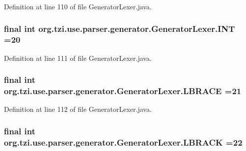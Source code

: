 Definition at line 110 of file Generator\-Lexer.\-java.

\hypertarget{classorg_1_1tzi_1_1use_1_1parser_1_1generator_1_1_generator_lexer_aea0b73a60dee6882153e7a97ca1c5a8f}{
\subsubsection[{I\-N\-T}]{\setlength{\rightskip}{0pt plus 5cm}final int org.\-tzi.\-use.\-parser.\-generator.\-Generator\-Lexer.\-I\-N\-T =20\hspace{0.3cm}{\ttfamily [static]}}}\label{classorg_1_1tzi_1_1use_1_1parser_1_1generator_1_1_generator_lexer_aea0b73a60dee6882153e7a97ca1c5a8f}


Definition at line 111 of file Generator\-Lexer.\-java.

\hypertarget{classorg_1_1tzi_1_1use_1_1parser_1_1generator_1_1_generator_lexer_a9e5cccb1d5e008308f9f47c9a26e463b}{
\subsubsection[{L\-B\-R\-A\-C\-E}]{\setlength{\rightskip}{0pt plus 5cm}final int org.\-tzi.\-use.\-parser.\-generator.\-Generator\-Lexer.\-L\-B\-R\-A\-C\-E =21\hspace{0.3cm}{\ttfamily [static]}}}\label{classorg_1_1tzi_1_1use_1_1parser_1_1generator_1_1_generator_lexer_a9e5cccb1d5e008308f9f47c9a26e463b}


Definition at line 112 of file Generator\-Lexer.\-java.

\hypertarget{classorg_1_1tzi_1_1use_1_1parser_1_1generator_1_1_generator_lexer_a04891707588b98d693693a593a5f88d7}{
\subsubsection[{L\-B\-R\-A\-C\-K}]{\setlength{\rightskip}{0pt plus 5cm}final int org.\-tzi.\-use.\-parser.\-generator.\-Generator\-Lexer.\-L\-B\-R\-A\-C\-K =22\hspace{0.3cm}{\ttfamily [static]}}}\label{classorg_1_1tzi_1_1use_1_1parser_1_1generator_1_1_generator_lexer_a04891707588b98d693693a593a5f88d7}


